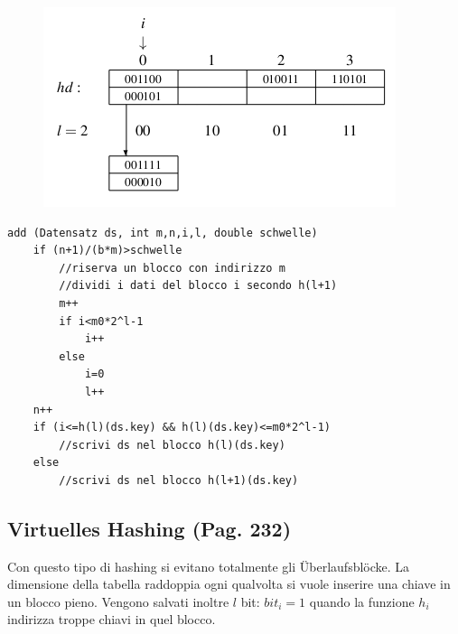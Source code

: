\documentclass[a4paper]{book}
\begin{document}
\begin{figure}[H]
\centering
\includegraphics[scale=0.45]{Figures/bsp3.png}
\end{figure}
\begin{lstlisting}
add (Datensatz ds, int m,n,i,l, double schwelle)
	if (n+1)/(b*m)>schwelle
		//riserva un blocco con indirizzo m
		//dividi i dati del blocco i secondo h(l+1)
		m++
		if i<m0*2^l-1
			i++
		else
			i=0
			l++
	n++
	if (i<=h(l)(ds.key) && h(l)(ds.key)<=m0*2^l-1)
		//scrivi ds nel blocco h(l)(ds.key)
	else
		//scrivi ds nel blocco h(l+1)(ds.key)	
\end{lstlisting}
\subsection{Virtuelles Hashing (Pag. 232)}
Con questo tipo di hashing si evitano totalmente gli Überlaufsblöcke. La dimensione della tabella raddoppia ogni qualvolta si vuole inserire una chiave in un blocco pieno. Vengono salvati inoltre $l$ bit: $bit_i=1$ quando la funzione $h_i$ indirizza troppe chiavi in quel blocco.
\end{document}
